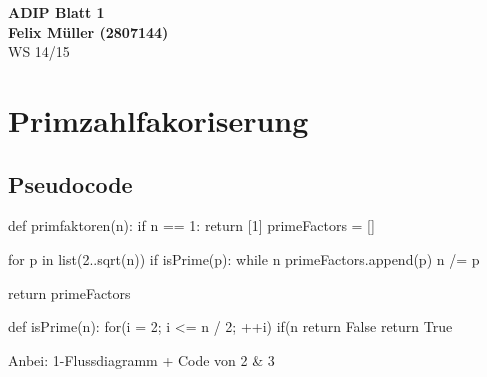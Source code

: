 \documentclass[fleqn, 12pt, a4paper]{article}
\begin{document}


  \begin{center}
  {\Large{\bfseries{ADIP Blatt 1 }}}\\[0.5cm]
  {\large{\bfseries{Felix Müller (2807144)}}}\\[0.4cm]
  WS 14/15
  \end{center}

  \section{Primzahlfakoriserung}
  \subsection{Pseudocode}
  \begin{PseudoCode}
  def primfaktoren(n):
    if n == 1: return [1]
    primeFactors = []

    for p in list(2..sqrt(n))
      if isPrime(p):
      while n %
        primeFactors.append(p)
        n /= p

    return primeFactors

  def isPrime(n):
      for(i = 2; i <= n / 2; ++i)
          if(n %
              return False
      return True
  \end{PseudoCode}

  Anbei: 1-Flussdiagramm + Code von 2 \& 3
\end{document}
